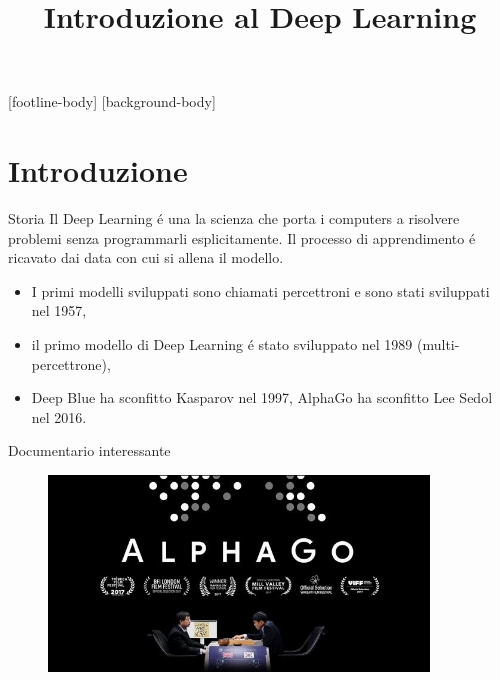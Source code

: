 \documentclass{beamer}
\title{Introduzione al Deep Learning}
\subtitle{}
\institute{{\inst{1}Dipartimento di Matematica, \newline Universit\`a di Pavia}}
\begin{document}

\frame{\titlepage}

\addtocounter{framenumber}{-1}
[footline-body]
[background-body]

\section{Introduzione}

\begin{frame}{Storia}
    Il Deep Learning \'e una la scienza che porta i computers a risolvere problemi senza programmarli esplicitamente. Il processo di apprendimento \'e ricavato dai data con cui si allena il modello.
    \pause
    \begin{itemize}
        \item  I primi modelli sviluppati sono chiamati percettroni e sono stati sviluppati nel 1957,
        \item  il primo modello di Deep Learning \'e stato sviluppato nel 1989 (multi-percettrone), 
        \item Deep Blue ha sconfitto Kasparov nel 1997, AlphaGo ha sconfitto Lee Sedol nel 2016.
    \end{itemize} 
\end{frame}

\begin{frame}{Documentario interessante}
    \begin{figure}
        \centering
        \includegraphics[width=0.9\textwidth]{logos/alphaGo.jpg}
    \end{figure}
\end{frame}
\end{document}
